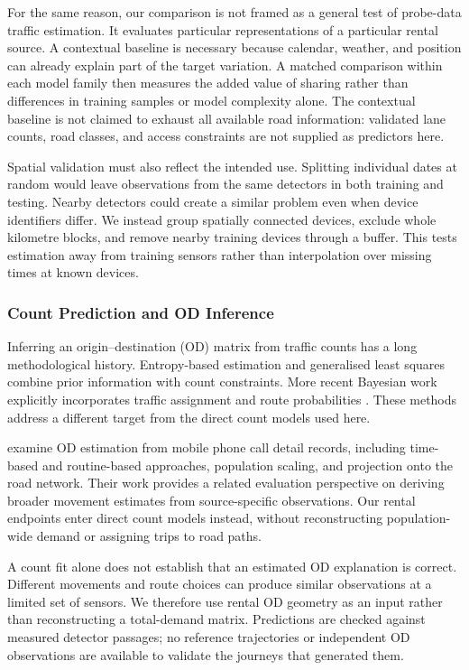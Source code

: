 \documentclass{interact}
\begin{document}
For the same reason, our comparison is not framed as a general test of probe-data traffic estimation. It evaluates particular representations of a particular rental source. A contextual baseline is necessary because calendar, weather, and position can already explain part of the target variation. A matched comparison within each model family then measures the added value of sharing rather than differences in training samples or model complexity alone. The contextual baseline is not claimed to exhaust all available road information: validated lane counts, road classes, and access constraints are not supplied as predictors here.

Spatial validation must also reflect the intended use. Splitting individual dates at random would leave observations from the same detectors in both training and testing. Nearby detectors could create a similar problem even when device identifiers differ. We instead group spatially connected devices, exclude whole kilometre blocks, and remove nearby training devices through a buffer. This tests estimation away from training sensors rather than interpolation over missing times at known devices.

\subsubsection{Count Prediction and OD Inference}
Inferring an origin--destination (OD) matrix from traffic counts has a long methodological history. Entropy-based estimation \citep{vanzuylen1980} and generalised least squares \citep{cascetta1984} combine prior information with count constraints. More recent Bayesian work explicitly incorporates traffic assignment and route probabilities \citep{hazelton2024}. These methods address a different target from the direct count models used here.

\citet{mamei2019od} examine OD estimation from mobile phone call detail records, including time-based and routine-based approaches, population scaling, and projection onto the road network. Their work provides a related evaluation perspective on deriving broader movement estimates from source-specific observations. Our rental endpoints enter direct count models instead, without reconstructing population-wide demand or assigning trips to road paths.

A count fit alone does not establish that an estimated OD explanation is correct. Different movements and route choices can produce similar observations at a limited set of sensors. We therefore use rental OD geometry as an input rather than reconstructing a total-demand matrix. Predictions are checked against measured detector passages; no reference trajectories or independent OD observations are available to validate the journeys that generated them.
\end{document}
